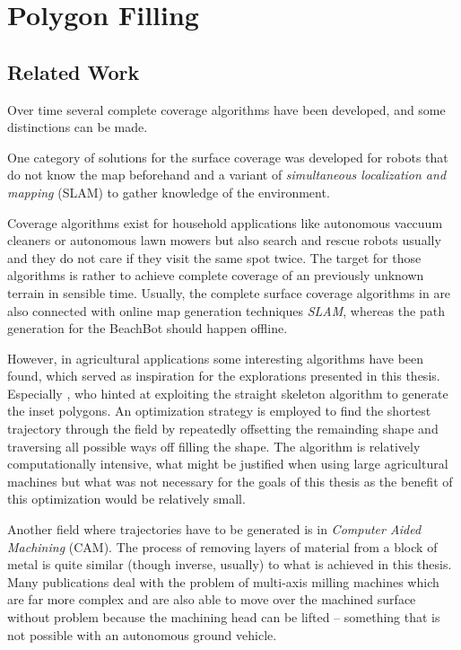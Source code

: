 \section{Polygon Filling}

\subsection{Related Work}

Over time several complete coverage algorithms have been developed, and some distinctions can be made. 

One category of solutions for the surface coverage  was developed for robots that do not know the map beforehand and a variant of \textit{simultaneous localization and mapping} (SLAM) to gather knowledge of the environment. 

Coverage algorithms exist for household applications like autonomous vaccuum cleaners or autonomous lawn mowers but also search and rescue robots usually and they  do not care if they visit the same spot twice. The target for those algorithms is rather to achieve complete coverage of an previously unknown terrain in sensible time. Usually, the complete surface coverage algorithms in are also connected with online map generation techniques \textit{SLAM}, whereas the path generation for the BeachBot should happen offline.

However, in agricultural applications some interesting algorithms have been found, which served as inspiration for the explorations presented in this thesis. Especially \citep{ROB:ROB20300}, who hinted at exploiting the straight skeleton algorithm to generate the inset polygons. An optimization strategy is employed to find the shortest trajectory through the field by repeatedly offsetting the remainding shape and traversing all possible ways off filling the shape. The algorithm is relatively computationally intensive, what might be justified when using large agricultural machines but what was not necessary for the goals of this thesis as the benefit of this optimization would be relatively small.

Another field where trajectories have to be generated is in \textit{Computer Aided Machining} (CAM). The process of removing layers of material from a block of metal is quite similar (though inverse, usually) to what is achieved in this thesis. Many publications deal with the problem of multi-axis milling machines which are far more complex and are also able to move over the machined surface without problem because the machining head can be lifted -- something that is not possible with an autonomous ground vehicle. 

